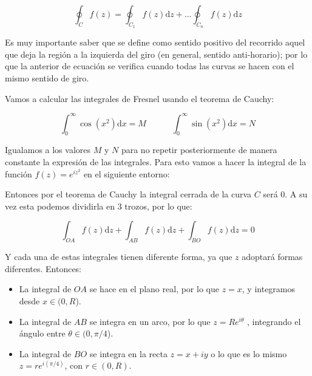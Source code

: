 \documentclass[12pt]{book}
\newcommand{\D}{\mathrm{d}}
\newcommand{\tquad}{\quad  \quad \quad}
\begin{document}
\begin{equation}
\oint_C f(z) = \oint_{C_1} f(z) \D z + \ldots \oint_{C_n} f(z) \D z 
\end{equation}

Es muy importante saber que se define como sentido positivo del recorrido aquel que deja la región a la izquierda del giro (en general, sentido anti-horario); por lo que la anterior de ecuación se verifica cuando todas las curvas se hacen con el mismo sentido de giro. \\


\hrulefill

Vamos a calcular las integrales de Fresnel usando el teorema de Cauchy:

\begin{equation}
\int_{0}^{\infty} \cos (x^2) \D x = M \tquad 
\int_{0}^{\infty} \sin (x^2) \D x = N
\end{equation}


Igualamos a los valores $M$ y $N$ para no repetir posteriormente de manera constante la expresión de las integrales. Para esto vamos a hacer la integral de la función $f(z)=e^{iz^2}$ en el siguiente entorno:

\begin{figure}[h!] \centering
{}
\end{figure}

Entonces por el teorema de Cauchy la integral cerrada de la curva $C$ será 0. A su vez esta podemos dividirla en 3 trozos, por lo que:

$$ \int_{OA} f(z) \D z +  \int_{AB} f(z) \D z +  \int_{BO} f(z) \D z = 0  $$

Y cada una de estas integrales tienen diferente forma, ya que $z$ adoptará formas diferentes. Entonces:

\begin{itemize}
\item La integral de $OA$ se hace en el plano real, por lo que $z = x$, y integramos desde $x \in (0,R$).
\item La integral de $AB$ se integra en un arco, por lo que $z=Re^{i \theta}$ , integrando el ángulo entre $\theta \in (0, \pi/4$).
\item La integral de $BO$ se integra en la recta $z = x + iy$ o lo que es lo mismo $z=re^{i (\pi/4)}$, con $r \in (0,R)$.
\end{itemize}
\end{document}
